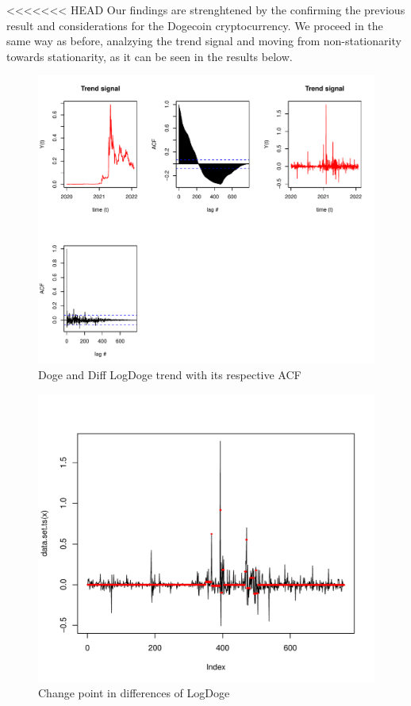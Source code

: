 \documentclass[
]{article}
\begin{document}
\textless\textless\textless\textless\textless\textless\textless{} HEAD
Our findings are strenghtened by the confirming the previous result and
considerations for the Dogecoin cryptocurrency. We proceed in the same
way as before, analzying the trend signal and moving from
non-stationarity towards stationarity, as it can be seen in the results
below.

\begin{figure}
\centering
\includegraphics{Trial1_files/figure-latex/fig19-1.pdf}
\caption{\label{fig:fig19}Doge and Diff LogDoge trend with its
respective ACF}
\end{figure}

\begin{figure}
\centering
\includegraphics{Trial1_files/figure-latex/fig20-1.pdf}
\caption{\label{fig:fig20}Change point in differences of LogDoge}
\end{figure}
\end{document}
